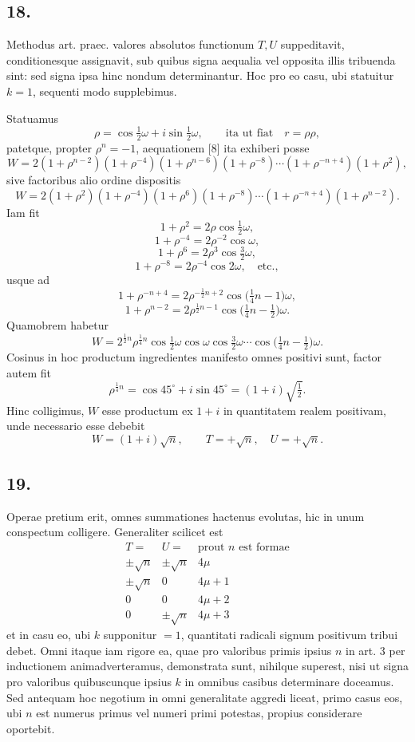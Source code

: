 \documentclass[12pt]{article}
\begin{document}
\subsection*{18.}

Methodus art. praec. valores absolutos functionum $T,U$ suppeditavit, conditionesque assignavit, sub quibus signa aequalia vel opposita illis tribuenda sint: sed signa ipsa hinc nondum determinantur. Hoc pro eo casu, ubi statuitur $k=1$, sequenti modo supplebimus.

Statuamus
\[
\rho=\cos\tfrac12\omega+i\sin\tfrac12\omega,\qquad \text{ita ut fiat}\quad r=\rho\rho,
\]
patetque, propter $\rho^n=-1$, aequationem [8] ita exhiberi posse
\[
W=2(1+\rho^{n-2})(1+\rho^{-4})(1+\rho^{n-6})(1+\rho^{-8})\cdots(1+\rho^{-n+4})(1+\rho^2),
\]
sive factoribus alio ordine dispositis
\[
W=2(1+\rho^2)(1+\rho^{-4})(1+\rho^6)(1+\rho^{-8})\cdots(1+\rho^{-n+4})(1+\rho^{n-2}).
\]
Iam fit
\[
1+\rho^2=2\rho\cos\tfrac12\omega,
\]
\[
1+\rho^{-4}=2\rho^{-2}\cos\omega,
\]
\[
1+\rho^6=2\rho^3\cos\tfrac32\omega,
\]
\[
1+\rho^{-8}=2\rho^{-4}\cos2\omega,\quad\text{etc.},
\]
usque ad
\[
1+\rho^{-n+4}=2\rho^{-\frac12n+2}\cos\bigl(\tfrac14n-1\bigr)\omega,
\]
\[
1+\rho^{n-2}=2\rho^{\frac12n-1}\cos\bigl(\tfrac14n-\tfrac12\bigr)\omega.
\]
Quamobrem habetur
\[
W=2^{\frac12n}\rho^{\frac14n}\cos\tfrac12\omega\cos\omega\cos\tfrac32\omega\cdots\cos\bigl(\tfrac14n-\tfrac12\bigr)\omega.
\]
Cosinus in hoc productum ingredientes manifesto omnes positivi sunt, factor autem fit
\[
\rho^{\frac14n}=\cos45^\circ+i\sin45^\circ=(1+i)\sqrt{\tfrac12}.
\]
Hinc colligimus, $W$ esse productum ex $1+i$ in quantitatem realem positivam, unde necessario esse debebit
\[
W=(1+i)\sqrt n,\qquad T=+\sqrt n,\quad U=+\sqrt n.
\]

\subsection*{19.}

Operae pretium erit, omnes summationes hactenus evolutas, hic in unum conspectum colligere. Generaliter scilicet est
\[
\begin{array}{c|c|c}
T= & U= & \text{prout } n\text{ est formae}\\ \hline
\pm\sqrt n & \pm\sqrt n & 4\mu\\
\pm\sqrt n & 0 & 4\mu+1\\
0 & 0 & 4\mu+2\\
0 & \pm\sqrt n & 4\mu+3
\end{array}
\]
et in casu eo, ubi $k$ supponitur $=1$, quantitati radicali signum positivum tribui debet. Omni itaque iam rigore ea, quae pro valoribus primis ipsius $n$ in art. 3 per inductionem animadverteramus, demonstrata sunt, nihilque superest, nisi ut signa pro valoribus quibuscunque ipsius $k$ in omnibus casibus determinare doceamus. Sed antequam hoc negotium in omni generalitate aggredi liceat, primo casus eos, ubi $n$ est numerus primus vel numeri primi potestas, propius considerare oportebit.
\end{document}
